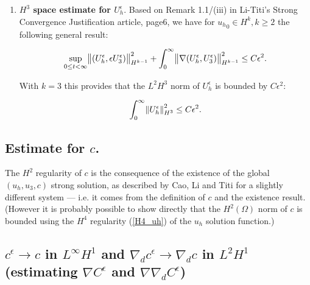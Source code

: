 \documentclass[11pt]{article}
\begin{document}
\begin{enumerate}
  \begin{equation} \label{H4_uh}
    u_h \in L^2_{\text{loc}} H^4
  \end{equation}
  
  solution function. (This result was used to prove estimates for $c$, but after all probably it is sufficient what we know about $c$ based on the fact that it is a strong solution, and thus is in $H^2.$)
  
  \item \textbf{$H^3$ space estimate for $U_h^\epsilon.$} Based on Remark 1.1/(iii) in Li-Titi's Strong Convergence Justification article, page6, we have for ${u_h}_0 \in H^k, k \geq 2$ the following general result:
  
  \begin{equation}
    \sup_{0 \leq t < \infty}{\norm{(U_h^\epsilon, \epsilon U_3^\epsilon)}_{H^{k-1}}^2} + \int_0^\infty \norm{\nabla (U_h^\epsilon, U_3^\epsilon)}_{H^{k-1}}^2 \leq C \epsilon^2.
  \end{equation}
  
  With $k=3$ this provides that the $L^2 H^3$ norm of $U_h^\epsilon$ is bounded by $C \epsilon^2:$
  
  \begin{equation} \label{H3_Uh}
    \int_0^\infty \norm{U_h^\epsilon}_{H^3}^2 \leq C \epsilon^2.
  \end{equation}

\end{enumerate}

\subsection{Estimate for $c$.} \label{estimateforc}

The $H^2$ regularity of $c$ is the consequence of the existence of the global $(u_h, u_3, c)$ strong solution, as described by Cao, Li and Titi for a slightly different system --- i.e. it comes from the definition of $c$ and the existence result. (However it is probably possible to show directly that the $H^2(\Omega)$ norm of $c$ is bounded using the $H^4$ regularity (\ref{H4_uh}) of the $u_h$ solution function.)

\subsection{$c^\epsilon \to c$ in $L^\infty H^1$ and $\nabla_d c^\epsilon \to \nabla_d c$ in $L^2 H^1$ (estimating $\nabla C^\epsilon$ and $\nabla \nabla_d C^\epsilon$)}
\end{document}
